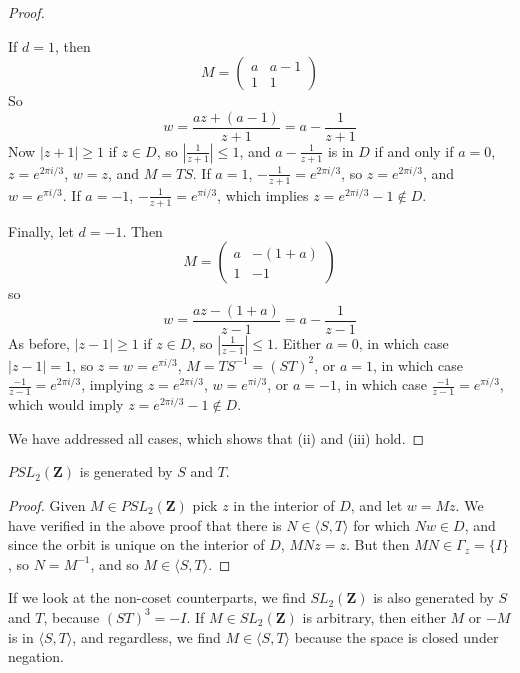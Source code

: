 \begin{proof}
\begin{itemize}
        If $d = 1$, then
        \[ M = \begin{pmatrix} a & a-1 \\ 1 & 1 \end{pmatrix} \]
        So
        \[ w = \frac{az + (a-1)}{z + 1} = a - \frac{1}{z+1} \]
        Now $|z+1| \geq 1$ if $z \in D$, so $|\frac{1}{z+1}| \leq 1$, and $a - \frac{1}{z+1}$ is in $D$ if and only if $a = 0$, $z = e^{2\pi i/3}$, $w = z$, and $M = TS$. If $a = 1$, $- \frac{1}{z+1} = e^{2\pi i/3}$, so $z = e^{2 \pi i/3}$, and $w = e^{\pi i/3}$. If $a = -1$, $- \frac{1}{z+1} = e^{\pi i/3}$, which implies $z = e^{2 \pi i/3} - 1 \not \in D$.

        Finally, let $d = -1$. Then
        \[ M = \begin{pmatrix} a & -(1 + a) \\ 1 & -1 \end{pmatrix} \]
        so
        \[ w = \frac{az - (1+a)}{z-1} = a - \frac{1}{z-1} \]
        As before, $|z-1| \geq 1$ if $z \in D$, so $|\frac{1}{z-1}| \leq 1$. Either $a = 0$, in which case $|z-1| = 1$, so $z = w = e^{\pi i/3}$, $M = TS^{-1} = (ST)^2$, or $a = 1$, in which case $\frac{-1}{z-1} = e^{2\pi i/3}$, implying $z = e^{2\pi i/3}$, $w = e^{\pi i/3}$, or $a = -1$, in which case $\frac{-1}{z-1} = e^{\pi i/3}$, which would imply $z = e^{2\pi i/3} - 1 \not \in D$.
    \end{itemize}
    We have addressed all cases, which shows that (ii) and (iii) hold.
\end{proof}

\begin{corollary}
    $PSL_2(\mathbf{Z})$ is generated by $S$ and $T$.
\end{corollary}
\begin{proof}
    Given $M \in PSL_2(\mathbf{Z})$ pick $z$ in the interior of $D$, and let $w = M z$. We have verified in the above proof that there is $N \in \langle S, T \rangle$ for which $Nw \in D$, and since the orbit is unique on the interior of $D$, $MNz = z$. But then $MN \in \Gamma_z = \{ I \}$, so $N = M^{-1}$, and so $M \in \langle S, T \rangle$.
\end{proof}

If we look at the non-coset counterparts, we find $SL_2(\mathbf{Z})$ is also generated by $S$ and $T$, because $(ST)^3 = -I$. If $M \in SL_2(\mathbf{Z})$ is arbitrary, then either $M$ or $-M$ is in $\langle S ,T \rangle$, and regardless, we find $M \in \langle S, T \rangle$ because the space is closed under negation.

